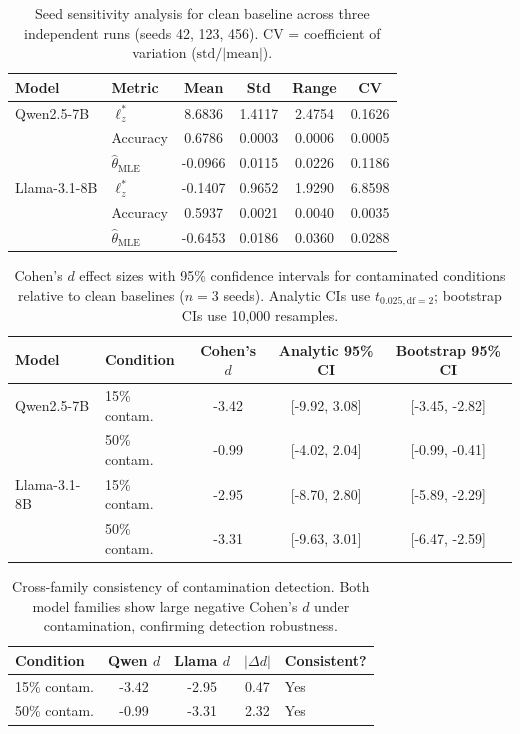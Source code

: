 \begin{table}[h]
\centering
\caption{Seed sensitivity analysis for clean baseline across three independent runs (seeds 42, 123, 456). CV = coefficient of variation ($\mathrm{std}/|\mathrm{mean}|$).}
\label{tab:seed_sensitivity}
\begin{tabular}{llcccc}
\toprule
Model & Metric & Mean & Std & Range & CV \\
\midrule
Qwen2.5-7B & $\ell_z^*$ & 8.6836 & 1.4117 & 2.4754 & 0.1626 \\
 & Accuracy & 0.6786 & 0.0003 & 0.0006 & 0.0005 \\
 & $\hat{\theta}_{\mathrm{MLE}}$ & -0.0966 & 0.0115 & 0.0226 & 0.1186 \\
\midrule
Llama-3.1-8B & $\ell_z^*$ & -0.1407 & 0.9652 & 1.9290 & 6.8598 \\
 & Accuracy & 0.5937 & 0.0021 & 0.0040 & 0.0035 \\
 & $\hat{\theta}_{\mathrm{MLE}}$ & -0.6453 & 0.0186 & 0.0360 & 0.0288 \\
\bottomrule
\end{tabular}
\end{table}

\begin{table}[h]
\centering
\caption{Cohen's $d$ effect sizes with 95\% confidence intervals for contaminated conditions relative to clean baselines ($n=3$ seeds). Analytic CIs use $t_{0.025, \text{df}=2}$; bootstrap CIs use 10{,}000 resamples.}
\label{tab:cohens_d_ci}
\begin{tabular}{llccc}
\toprule
Model & Condition & Cohen's $d$ & Analytic 95\% CI & Bootstrap 95\% CI \\
\midrule
Qwen2.5-7B & 15\% contam. & -3.42 & [-9.92, 3.08] & [-3.45, -2.82] \\
 & 50\% contam. & -0.99 & [-4.02, 2.04] & [-0.99, -0.41] \\
\midrule
Llama-3.1-8B & 15\% contam. & -2.95 & [-8.70, 2.80] & [-5.89, -2.29] \\
 & 50\% contam. & -3.31 & [-9.63, 3.01] & [-6.47, -2.59] \\
\bottomrule
\end{tabular}
\end{table}

\begin{table}[h]
\centering
\caption{Cross-family consistency of contamination detection. Both model families show large negative Cohen's $d$ under contamination, confirming detection robustness.}
\label{tab:cross_family}
\begin{tabular}{lcccl}
\toprule
Condition & Qwen $d$ & Llama $d$ & $|\Delta d|$ & Consistent? \\
\midrule
15\% contam. & -3.42 & -2.95 & 0.47 & Yes \\
50\% contam. & -0.99 & -3.31 & 2.32 & Yes \\
\bottomrule
\end{tabular}
\end{table}